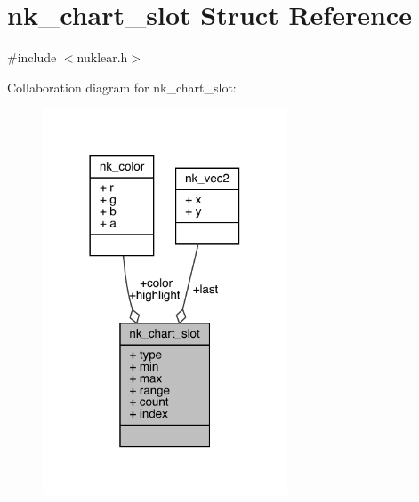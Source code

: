 \hypertarget{structnk__chart__slot}{}\section{nk\+\_\+chart\+\_\+slot Struct Reference}
\label{structnk__chart__slot}


{\ttfamily \#include $<$nuklear.\+h$>$}



Collaboration diagram for nk\+\_\+chart\+\_\+slot\+:
\nopagebreak
\begin{figure}[H]
\begin{center}
\leavevmode
\includegraphics[width=206pt]{structnk__chart__slot__coll__graph}
\end{center}
\end{figure}
